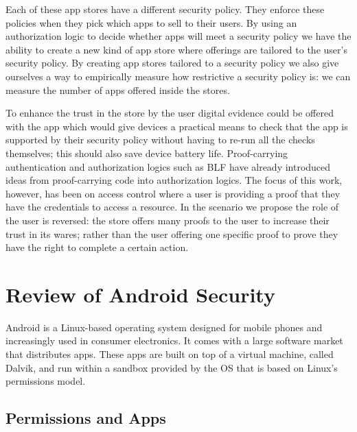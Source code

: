\documentclass[a4paper,sfsidenotes]{tufte-book}
\begin{document}
Each of these app stores have a different security policy.  They enforce these
policies when they pick which apps to sell to their users.  By using an
authorization logic to decide whether apps will meet a security policy we have
the ability to create a new kind of app store where offerings are tailored to
the user's security policy.  By creating app stores tailored to a security
policy we also give ourselves a way to empirically measure how restrictive a
security policy is: we can measure the number of apps offered inside the stores.

To enhance the trust in the store by the user digital evidence could be offered
with the app which would give devices a practical means to check that the app is
supported by their security policy without having to re-run all the checks
themselves; this should also save device battery life.  Proof-carrying
authentication\cite{Appel:1999dq} and authorization logics such as
BLF\cite{Whitehead:2004bu} have already introduced ideas from proof-carrying
code into authorization logics. The focus of this work, however, has been on
access control where a user is providing a proof that they have the credentials
to access a resource.   In the scenario we propose the role of the user is
reversed: the store offers many proofs to the user to increase their trust in
its wares; rather than the user offering one specific proof to prove they have
the right to complete a certain action.


\section{Review of Android Security}

Android is a Linux-based operating system designed for mobile phones and
increasingly used in consumer electronics. It comes with a large software
market that distributes apps. These apps are built on top of a virtual machine,
called Dalvik, and run within a sandbox provided by the OS that is based on
Linux's permissions model\cite{Drake:2014uq}.

\subsection{Permissions and Apps}
\end{document}
